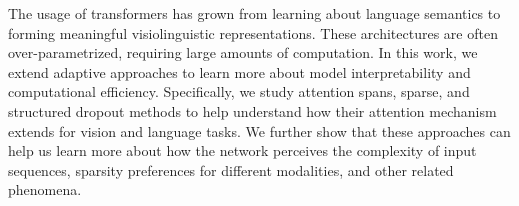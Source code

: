 The usage of transformers has grown from learning about language semantics to forming meaningful visiolinguistic representations. These architectures are often over-parametrized, requiring large amounts of computation. In this work, we extend adaptive approaches to learn more about model interpretability and computational efficiency. Specifically, we study attention spans, sparse, and structured dropout methods to help understand how their attention mechanism extends for vision and language tasks. We further show that these approaches can help us learn more about how the network perceives the complexity of input sequences, sparsity preferences for different modalities, and other related phenomena.
